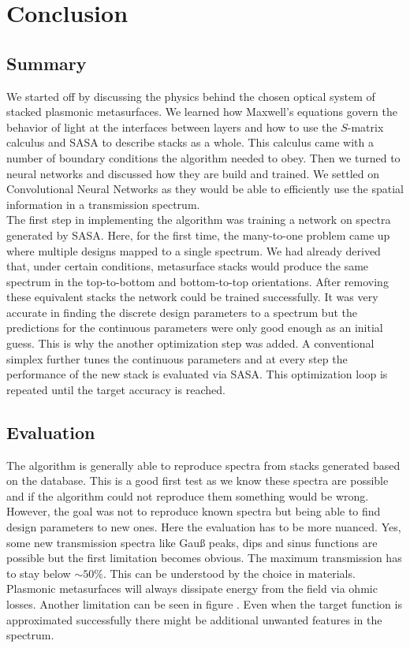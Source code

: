 \section{Conclusion} \label{sec:conclusion}

\subsection{Summary}
We started off by discussing the physics behind the chosen optical system of stacked plasmonic metasurfaces. 
We learned how Maxwell's equations govern the behavior of light at the interfaces between layers and how to use the $S$-matrix calculus and SASA to describe stacks as a whole. This calculus came with a number of boundary conditions the algorithm needed to obey. Then we turned to neural networks and discussed how they are build and trained. We settled on Convolutional Neural Networks as they would be able to efficiently use the spatial information in a transmission spectrum.
\\

\indent
The first step in implementing the algorithm was training a network on spectra generated by SASA. Here, for the first time, the many-to-one problem came up where multiple designs mapped to a single spectrum. We had already derived that, under certain conditions, metasurface stacks would produce the same spectrum in the top-to-bottom and bottom-to-top orientations. After removing these equivalent stacks the network could be trained successfully. It was very accurate in finding the discrete design parameters to a spectrum but the predictions for the continuous parameters were only good enough as an initial guess.
This is why the another optimization step was added. A conventional simplex further tunes the continuous parameters and at every step the performance of the new stack is evaluated via SASA. This optimization loop is repeated until the target accuracy is reached.


\subsection{Evaluation} \label{sec:eval}
The algorithm is generally able to reproduce spectra from stacks generated based on the database. 
This is a good first test as we know these spectra are possible and if the algorithm could not reproduce them something would be wrong. However, the goal was not to reproduce known spectra but being able to find design parameters to new ones. Here the evaluation has to be more nuanced. Yes, some new transmission spectra like Gauß peaks, dips and sinus functions are possible but the first limitation becomes obvious. The maximum transmission has to stay below $\sim 50\%$. This can be understood by the choice in materials. Plasmonic metasurfaces will always dissipate energy from the field via ohmic losses. Another limitation can be seen in figure . Even when the target function is approximated successfully there might be additional unwanted features in the spectrum. 
\\

